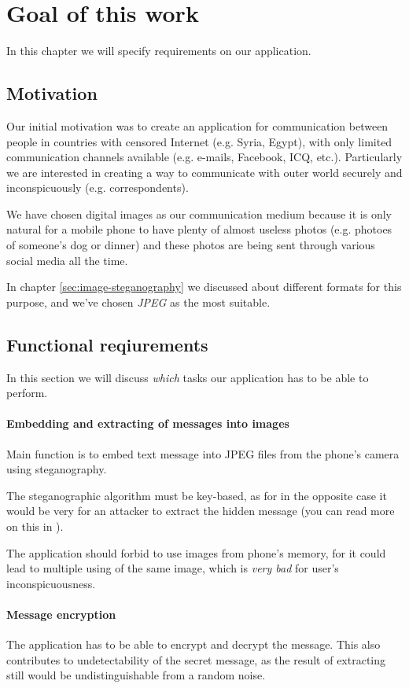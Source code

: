 \chapter{Goal of this work}

In this chapter we will specify requirements on our application.

\section{Motivation}

Our initial motivation was to create an application for communication between
people in countries with censored Internet (e.g. Syria, Egypt), with only limited communication channels
available (e.g. e-mails, Facebook, ICQ, etc.). Particularly we are interested in
creating a way to communicate with outer world securely and inconspicuously 
(e.g. correspondents).

We have chosen digital images as our communication medium because it is only natural for
a mobile phone to have plenty of almost useless photos (e.g. photoes of someone's dog or dinner)
and these photos are being sent through various social media all the time.

In chapter \ref{sec:image-steganography} we discussed about different formats for
this purpose, and we've chosen \emph{JPEG} as the most suitable.

\section{Functional reqiurements}
In this section we will discuss \emph{which} tasks our application has to be able to perform.

\subsubsection{Embedding and extracting of messages into images}
Main function is to embed text message into JPEG files from the phone's camera using steganography.

The steganographic algorithm must be key-based, as for in the opposite case it would be very for an attacker
to extract the hidden message (you can read more on this in \cite{Ostertag1996}).

The application should forbid to use images from phone's memory, for it could lead to multiple 
using of the same image, which is \emph{very bad} for user's inconspicuousness.

\subsubsection{Message encryption}
The application has to be able to encrypt and decrypt the message. This also contributes
to undetectability of the secret message, as the result of extracting still would be 
undistinguishable from a random noise.

